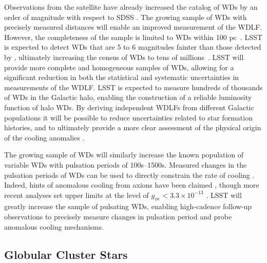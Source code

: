 Observations from the \Gaia satellite have already increased the catalog of WDs by an order of magnitude with respect to SDSS \citep{1805.01227,1807.02559,1807.03315}.
The growing sample of WDs with precisely measured distances will enable an improved measurement of the WDLF.  
However, the completeness of the \Gaia sample is limited to WDs within 100 pc~\citep{1807.03315}.
LSST is expected to detect WDs that are 5 to 6 magnitudes fainter than those detected by \Gaia, ultimately increasing the census of WDs to tens of millions~\citep{0912.0201}.
LSST will provide more complete and homogeneous samples of WDs, allowing for a significant reduction in both the statistical and systematic uncertainties in measurements of the WDLF. 
LSST is expected to measure hundreds of thousands of WDs in the Galactic halo, enabling the construction of a reliable luminosity function of halo WDs. 
By deriving independent WDLFs from different Galactic populations it will be possible to reduce uncertainties related to star formation histories, and to ultimately provide a more clear assessment of the physical origin of the cooling anomalies \citep{Isern:2018uce}. 

The growing sample of WDs will similarly increase the known population of variable WDs with pulsation periods of 100s--1500s. 
Measured changes in the pulsation periods of WDs can be used to directly constrain the rate of cooling \citep[\eg][]{1007.2659}.
Indeed, hints of anomalous cooling from axions have been claimed \citep[\eg][]{Corsico:2012ki,Corsico:2012sh}, though more recent analyses set upper limits at the level of $g_{\phi e} < 3.3 \times 10^{-13}$ \citep{Battich:2016htm}. 
LSST will greatly increase the sample of pulsating WDs, enabling high-cadence follow-up observations to precisely measure changes in pulsation period and probe anomalous cooling mechanisms.


\subsection{Globular Cluster Stars}

